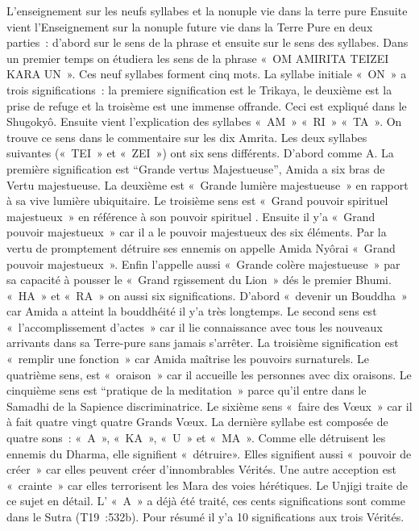 L'enseignement sur les neufs syllabes et la nonuple vie dans la terre pure
Ensuite vient l’Enseignement sur la nonuple future vie dans la Terre Pure en deux parties : d’abord sur le sens de la phrase et ensuite sur le sens des syllabes.
Dans un premier temps on étudiera les sens de la phrase « OM AMIRITA TEIZEI KARA UN ». Ces neuf syllabes forment cinq mots. La syllabe initiale « ON » a trois significations : la premiere signification est le Trikaya, le deuxième est la prise de refuge et la troisème est une immense offrande. Ceci est expliqué dans le Shugokyô.
Ensuite vient l’explication des syllabes « AM » « RI » « TA ». On trouve ce sens dans le commentaire sur les dix Amrita.
Les deux syllabes suivantes (« TEI » et « ZEI ») ont six sens différents. D’abord comme A.
La première signification est “Grande vertus Majestueuse”, Amida a six bras de Vertu majestueuse. La deuxième est « Grande lumière majestueuse » en rapport à sa vive lumière ubiquitaire. Le troisième sens est « Grand pouvoir spirituel majestueux » en référence à son  pouvoir spirituel .  Ensuite il y’a « Grand pouvoir majestueux » car il a le pouvoir majestueux des six éléments. Par la vertu de promptement détruire ses ennemis on appelle Amida Nyôrai « Grand pouvoir majestueux ». Enfin  l’appelle aussi « Grande colère majestueuse » par sa capacité à pousser le « Grand rgissement du Lion » dés le premier Bhumi.
« HA » et « RA » on aussi six significations. D’abord « devenir un Bouddha » car Amida a atteint la bouddhéité il y’a très longtemps. Le second sens est « l’accomplissement d’actes » car il lie connaissance avec tous les nouveaux arrivants dans sa Terre-pure sans jamais s’arrêter. La troisième signification est « remplir une fonction » car Amida maîtrise les pouvoirs surnaturels. Le quatrième sens, est « oraison » car il accueille les personnes avec dix oraisons. Le cinquième sens est “pratique de la meditation » parce qu’il entre dans le Samadhi de la Sapience discriminatrice. Le sixième sens « faire des Vœux » car il à fait quatre vingt quatre Grands Vœux.
La dernière syllabe est composée de quatre sons : « A », « KA », « U » et « MA ». Comme elle détruisent les ennemis du Dharma, elle signifient « détruire». Elles signifient aussi « pouvoir de créer » car elles peuvent créer d’innombrables Vérités. Une autre acception est « crainte » car elles terrorisent les Mara des voies hérétiques. Le Unjigi traite de ce sujet en détail.
L’ « A » a déjà été traité, ces cents significations sont comme dans le Sutra (T19 :532b). Pour résumé il y’a 10 significations aux trois Vérités.
 
